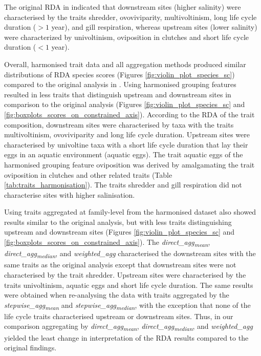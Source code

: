 \documentclass{article}
\begin{document}
The original RDA in \citet{szocs_effects_2014} indicated that downstream sites (higher salinity) were characterised by the traits shredder, ovoviviparity, multivoltinism, long life cycle duration ($> 1$ year), and gill respiration, whereas upstream sites (lower salinity) were characterized by univoltinism, oviposition in clutches and short life cycle duration ($< 1$ year). 

Overall, harmonised trait data and all aggregation methods produced similar distributions of RDA species scores (Figures \ref{fig:violin_plot_species_sc}) compared to the original analysis in \citet{szocs_effects_2014}. Using harmonised grouping features resulted in less traits that distinguish upstream and downstream sites in comparison to the original analysis (Figures \ref{fig:violin_plot_species_sc} and \ref{fig:boxplots_scores_on_constrained_axis}). According to the RDA of the trait composition, downstream sites were characterised by taxa with the traits multivoltinism, ovoviviparity and long life cycle duration. Upstream sites were characterised by univoltine taxa with a short life cycle duration that lay their eggs in an aquatic environment (aquatic eggs). The trait aquatic eggs of the harmonised grouping feature oviposition was derived by amalgamating the trait oviposition in clutches and other related traits (Table \ref{tab:traits_harmonisation}). The traits shredder and gill respiration did not characterise sites with higher salinisation.

Using traits aggregated at family-level from the harmonised dataset also showed results similar to the original analysis, but with less traits distinguishing upstream and downstream sites (Figures \ref{fig:violin_plot_species_sc} and \ref{fig:boxplots_scores_on_constrained_axis}). The \textit{direct\_agg\textsubscript{mean}}, \textit{direct\_agg\textsubscript{median}}, and \textit{weighted\_agg} 
characterised the downstream sites with the same traits as the original analysis except that downstream sites were not characterised by the trait shredder. Upstream sites were characterised by the traits univoltinism, aquatic eggs and short life cycle duration. The same results were obtained when re-analysing the data with traits aggregated by the \textit{stepwise\_agg\textsubscript{mean}} and \textit{stepwise\_agg\textsubscript{median}}, with the exception that none of the life cycle traits characterised upstream or downstream sites. Thus, in our comparison aggregating by \textit{direct\_agg\textsubscript{mean}}, \textit{direct\_agg\textsubscript{median}}, and \textit{weighted\_agg} yielded the least change in interpretation of the RDA results compared to the original findings.
\end{document}
